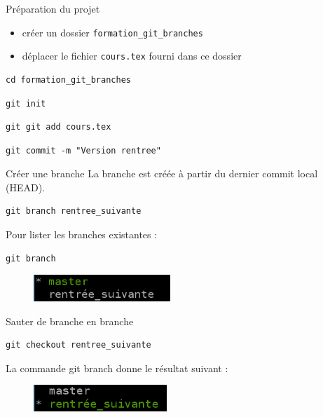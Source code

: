 \documentclass{beamer}
\begin{document}
\begin{frame}[fragile]{Préparation du projet}
	\begin{itemize}
		\item créer un dossier \texttt{formation\_git\_branches}
		\item déplacer le fichier \texttt{cours.tex} fourni dans ce dossier
	\end{itemize}
	
	\begin{lstlisting}[frame=single]
		cd formation_git_branches
	\end{lstlisting}
	\begin{lstlisting}[frame=single]
		git init
	\end{lstlisting}
	\begin{lstlisting}[frame=single]
		git git add cours.tex
	\end{lstlisting}
	\begin{lstlisting}[frame=single]
		git commit -m "Version rentree"
	\end{lstlisting}
\end{frame}

\begin{frame}[fragile]{Créer une branche}
	La branche est créée à partir du dernier commit local (HEAD).
	\begin{lstlisting}[frame=single]
		git branch rentree_suivante
	\end{lstlisting}
	
	\vfill{}
	Pour lister les branches existantes : 

	\begin{lstlisting}[frame=single]
		git branch
	\end{lstlisting}
	\begin{figure}
		\centering
		\includegraphics[height=1cm]{img/shot5}
	\end{figure}
\end{frame}

\begin{frame}[fragile]{Sauter de branche en branche}
	
	\begin{lstlisting}[frame=single]
		git checkout rentree_suivante
	\end{lstlisting}
	
	\vfill{}
	La commande git branch donne le résultat suivant :

	\begin{figure}
		\centering
		\includegraphics[height=1cm]{img/shot6}
	\end{figure}
\end{frame}
\end{document}
